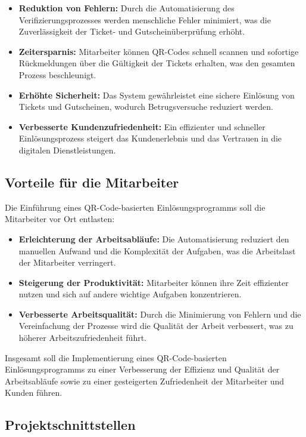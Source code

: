 \begin{itemize}
    \item \textbf{Reduktion von Fehlern:} Durch die Automatisierung des Verifizierungsprozesses werden menschliche Fehler minimiert, was die Zuverlässigkeit der Ticket- und Gutscheinüberprüfung erhöht.
    \item \textbf{Zeitersparnis:} Mitarbeiter können QR-Codes schnell scannen und sofortige Rückmeldungen über die Gültigkeit der Tickets erhalten, was den gesamten Prozess beschleunigt.
    \item \textbf{Erhöhte Sicherheit:} Das System gewährleistet eine sichere Einlösung von Tickets und Gutscheinen, wodurch Betrugsversuche reduziert werden.
    \item \textbf{Verbesserte Kundenzufriedenheit:} Ein effizienter und schneller Einlösungsprozess steigert das Kundenerlebnis und das Vertrauen in die digitalen Dienstleistungen.
\end{itemize}

\subsection{Vorteile für die Mitarbeiter}
Die Einführung eines QR-Code-basierten Einlösungsprogramms soll die Mitarbeiter vor Ort entlasten:

\begin{itemize}
    \item \textbf{Erleichterung der Arbeitsabläufe:} Die Automatisierung reduziert den manuellen Aufwand und die Komplexität der Aufgaben, was die Arbeitslast der Mitarbeiter verringert.
    \item \textbf{Steigerung der Produktivität:} Mitarbeiter können ihre Zeit effizienter nutzen und sich auf andere wichtige Aufgaben konzentrieren.
    \item \textbf{Verbesserte Arbeitsqualität:} Durch die Minimierung von Fehlern und die Vereinfachung der Prozesse wird die Qualität der Arbeit verbessert, was zu höherer Arbeitszufriedenheit führt.
\end{itemize}

Insgesamt soll die Implementierung eines QR-Code-basierten Einlösungsprogramms zu einer Verbesserung der Effizienz und Qualität der Arbeitsabläufe sowie zu einer gesteigerten Zufriedenheit der Mitarbeiter und Kunden führen.

\subsection{Projektschnittstellen} 
\label{sec:Projektschnittstellen}

